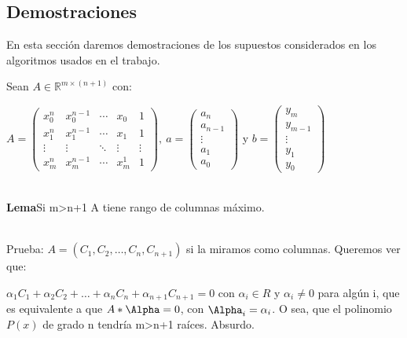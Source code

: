 \subsection{Demostraciones}

En esta sección daremos demostraciones de los supuestos considerados en los algoritmos usados en el
trabajo.

Sean $A \in \mathbb{R}^{m\times (n+1)}$ con:


  $ A = \begin{pmatrix}
    x_0^n & x_0^{n-1} & \cdots &  x_0  & 1 \\
    x_1^{n} & x_1^{n-1} & \cdots & x_1 & 1 \\
    \vdots  & \vdots  & \ddots & \vdots  & \vdots \\
    x_m^{n} & x_m^{n-1} & \cdots & x_m^1 & 1
        \end{pmatrix}, \
   a = \begin{pmatrix}
        a_n \\
        a_{n-1} \\
        \vdots \\
        a_1 \\
        a_0
       \end{pmatrix}
  $ y $
  b = \begin{pmatrix}
        y_m \\
        y_{m-1} \\
        \vdots \\
        y_1 \\
        y_0
       \end{pmatrix}
  $



\ \\
\textbf{Lema}Si m>n+1 A tiene rango de columnas máximo.

\ \\
Prueba:
  $A = ( C_1, C_2, \ldots, C_n, C_{n+1} )$ si la miramos como columnas. Queremos ver que:

$\alpha_1C_1+\alpha_2C_2+\hdots+\alpha_nC_n+\alpha_{n+1}C_{n+1} = 0$ con $\alpha_i \in R$ y $\alpha_i
\neq 0$ para algún i, que es equivalente a que $A*\Alpha=0$, con $\Alpha_i = \alpha_i$. O sea, que
el polinomio $P(x)$ de grado n tendría m>n+1 raíces. Absurdo.

